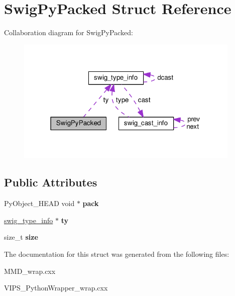\hypertarget{structSwigPyPacked}{}\section{Swig\+Py\+Packed Struct Reference}
\label{structSwigPyPacked}


Collaboration diagram for Swig\+Py\+Packed\+:
\nopagebreak
\begin{figure}[H]
\begin{center}
\leavevmode
\includegraphics[width=304pt]{structSwigPyPacked__coll__graph}
\end{center}
\end{figure}
\subsection*{Public Attributes}
\begin{DoxyCompactItemize}
\item 
Py\+Object\+\_\+\+H\+E\+AD void $\ast$ {\bfseries pack}\hypertarget{structSwigPyPacked_a90bf060d4d9b7924acc8bc81525244d4}{}\label{structSwigPyPacked_a90bf060d4d9b7924acc8bc81525244d4}

\item 
\hyperlink{structswig__type__info}{swig\+\_\+type\+\_\+info} $\ast$ {\bfseries ty}\hypertarget{structSwigPyPacked_ae179dcfa49ddb42652601334198d4271}{}\label{structSwigPyPacked_ae179dcfa49ddb42652601334198d4271}

\item 
size\+\_\+t {\bfseries size}\hypertarget{structSwigPyPacked_aed2bfb8fb3c9f804c386215db63921cb}{}\label{structSwigPyPacked_aed2bfb8fb3c9f804c386215db63921cb}

\end{DoxyCompactItemize}


The documentation for this struct was generated from the following files\+:\begin{DoxyCompactItemize}
\item 
M\+M\+D\+\_\+wrap.\+cxx\item 
V\+I\+P\+S\+\_\+\+Python\+Wrapper\+\_\+wrap.\+cxx\end{DoxyCompactItemize}
